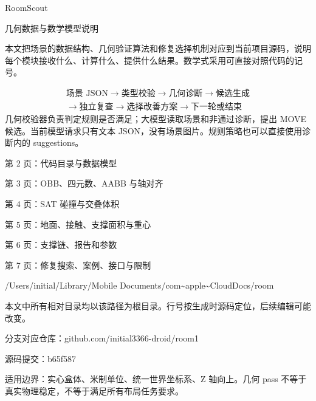 \documentclass[10pt,a4paper]{article}
\begin{document}
{\color{ink}\LARGE RoomScout\par 几何数据与数学模型说明\par}\vspace{5pt}
\par{}
本文把场景的数据结构、几何验证算法和修复选择机制对应到当前项目源码，说明每个模块接收什么、计算什么、提供什么结果。数学式采用可直接对照代码的记号。\par
\par{}
\[\begin{gathered}\text{场景 JSON}\to\text{类型校验}\to\text{几何诊断}\to\text{候选生成}\\ \to\text{独立复查}\to\text{选择改善方案}\to\text{下一轮或结束}\end{gathered}\]
几何校验器负责判定规则是否满足；大模型读取场景和非通过诊断，提出 MOVE 候选。当前模型请求只有文本 JSON，没有场景图片。规则策略也可以直接使用诊断内的 suggestions。\par
\par{}
第 2 页：代码目录与数据模型\par 第 3 页：OBB、四元数、AABB 与轴对齐\par 第 4 页：SAT 碰撞与交叠体积\par 第 5 页：地面、接触、支撑面积与重心\par 第 6 页：支撑链、报告和参数\par 第 7 页：修复搜索、案例、接口与限制\par
\par{}
{\footnotesize\color{ink} /Users/initial/Library/Mobile Documents/com\textasciitilde{}apple\textasciitilde{}CloudDocs/room\par}
{\footnotesize\color{ink} 本文中所有相对目录均以该路径为根目录。行号按生成时源码定位，后续编辑可能改变。\par}
{\footnotesize\color{ink} 分支对应仓库：github.com/initial3366-droid/room1\par 源码提交：b65f587\par}
适用边界：实心盒体、米制单位、统一世界坐标系、Z 轴向上。几何 pass 不等于真实物理稳定，不等于满足所有布局任务要求。\par
\end{document}
